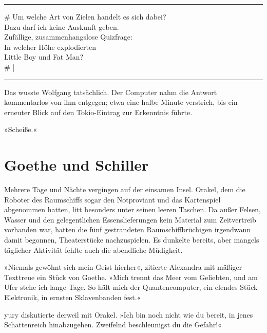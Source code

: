 \noindent \parbox{\textwidth}{ \vspace{3ex} \hrule \vspace{3ex}

    \begin{footnotesize}
    \begin{ttfamily}

\noindent \# Um welche Art von Zielen handelt es sich dabei?\\
\noindent Dazu darf ich keine Auskunft geben.\\
\noindent Zufällige, zusammenhangslose Quizfrage:\\
\noindent In welcher Höhe explodierten\\
\noindent Little Boy und Fat Man?\\
\noindent \# |

    \end{ttfamily}
    \end{footnotesize}

\vspace{3ex} \hrule \vspace{3ex} }

Das wusste Wolfgang tatsächlich. Der Computer nahm die Antwort kommentarlos von ihm entgegen; etwa eine halbe Minute verstrich, bis ein erneuter Blick auf den Tokio-Eintrag zur Erkenntnis führte.

»Scheiße.«


\chapter{Goethe und Schiller}

Mehrere Tage und Nächte vergingen auf der einsamen Insel. Orakel, dem die Roboter des Raumschiffs sogar den Notproviant und das Kartenspiel abgenommen hatten, litt besonders unter seinen leeren Taschen. Da außer Felsen, Wasser und den gelegentlichen Essenslieferungen kein Material zum Zeitvertreib vorhanden war, hatten die fünf gestrandeten Raumschiffbrüchigen irgendwann damit begonnen, Theaterstücke nachzuspielen. Es dunkelte bereits, aber mangels täglicher Aktivität fehlte auch die abendliche Müdigkeit.

»Niemals gewöhnt sich mein Geist hierher«, zitierte Alexandra mit mäßiger Texttreue ein Stück von Goethe. »Mich trennt das Meer vom Geliebten, und am Ufer stehe ich lange Tage. So hält mich der Quantencomputer, ein elendes Stück Elektronik, in ernsten Sklavenbanden fest.«

yury diskutierte derweil mit Orakel. »Ich bin noch nicht wie du bereit, in jenes Schattenreich hinabzugehen. Zweifelnd beschleunigst du die Gefahr!«

